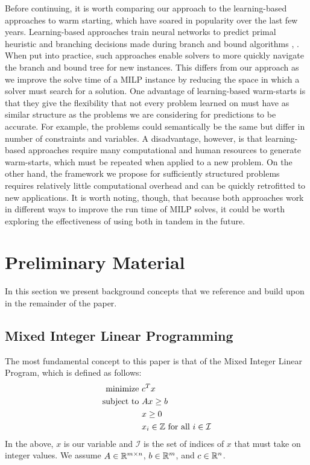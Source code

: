 \documentclass[10pt]{article}
\begin{document}
	Before continuing, it is worth comparing our approach to the learning-based approaches to warm starting, which have soared in popularity over the last few years. Learning-based approaches train neural networks to predict primal heuristic and branching decisions made during branch and bound algorithms \cite{google}, \cite{l2b}. When put into practice, such approaches enable solvers to more quickly navigate the branch and bound tree for new instances. This differs from our approach as we improve the solve time of a MILP instance by reducing the space in which a solver must search for a solution. One advantage of learning-based warm-starts is that they give the flexibility that not every problem learned on must have as similar structure as the problems we are considering for predictions to be accurate. For example, the problems could semantically be the same but differ in number of constraints and variables. A disadvantage, however, is that learning-based approaches require many computational and human resources to generate warm-starts, which must be repeated when applied to a new problem. On the other hand, the framework we propose for sufficiently structured problems requires relatively little computational overhead and can be quickly retrofitted to new applications. It is worth noting, though, that because both approaches work in different ways to improve the run time of MILP solves, it could be worth exploring the effectiveness of using both in tandem in the future.
	
	\section{Preliminary Material} \label{s:prelim}
	In this section we present background concepts that we reference and build upon in the remainder of the paper.
	
	\subsection{Mixed Integer Linear Programming} \label{ss:milp}
	The most fundamental concept to this paper is that of the Mixed Integer Linear Program, which is defined as follows:
	\begin{align}
		\begin{split}
			\text{minimize } & c^T x \\
			\text{subject to } & Ax \geq b \\
			& x \geq 0 \\
			& x_i \in \mathbb{Z} \text{ for all } i \in \mathcal{I}
		\end{split} \label{e:mip}
	\end{align}
	In the above, $ x $ is our variable and $ \mathcal{I} $ is the set of indices of $ x $ that must take on integer values. We assume $ A \in \mathbb{R}^{m \times n} $, $ b \in \mathbb{R}^m $, and $ c \in \mathbb{R}^n $.
	
\end{document}
